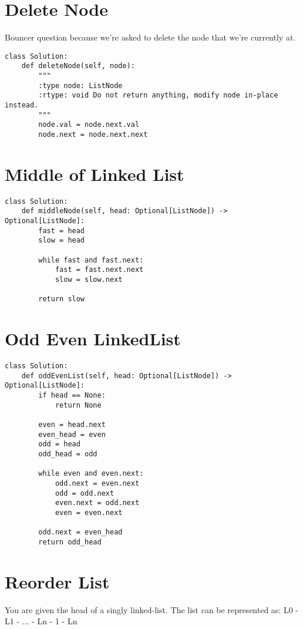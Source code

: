 \documentclass[24pt, a4]{article}
\begin{document}
\section{Delete Node}
Bouncer question because we're asked to delete the node that we're currently at.

\begin{lstlisting}
class Solution:
    def deleteNode(self, node):
        """
        :type node: ListNode
        :rtype: void Do not return anything, modify node in-place instead.
        """
        node.val = node.next.val
        node.next = node.next.next
\end{lstlisting}

\section{Middle of Linked List}
\begin{lstlisting}
class Solution:
    def middleNode(self, head: Optional[ListNode]) -> Optional[ListNode]:
        fast = head
        slow = head
        
        while fast and fast.next:
            fast = fast.next.next
            slow = slow.next
        
        return slow
\end{lstlisting}

\section{Odd Even LinkedList}
\begin{lstlisting}
class Solution:
    def oddEvenList(self, head: Optional[ListNode]) -> Optional[ListNode]:
        if head == None:
            return None
        
        even = head.next
        even_head = even
        odd = head
        odd_head = odd
        
        while even and even.next:
            odd.next = even.next
            odd = odd.next
            even.next = odd.next
            even = even.next
        
        odd.next = even_head
        return odd_head
\end{lstlisting}

\section{Reorder List}
You are given the head of a singly linked-list. The list can be represented as:
L0 - L1 - ... - Ln - 1 - Ln
\end{document}
